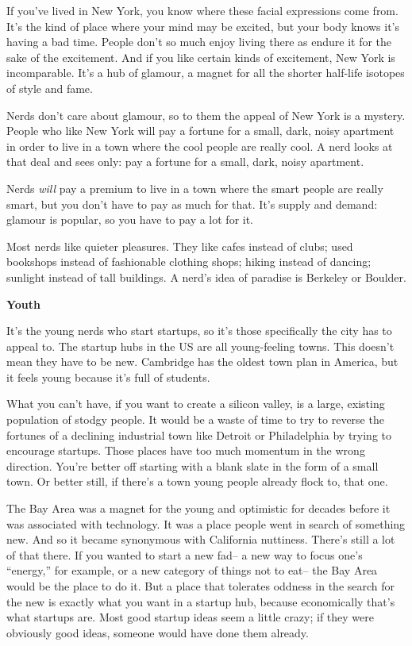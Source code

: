 \documentclass[12pt]{book}
\begin{document}
If you've lived in New York, you know where these facial expressions
come from. It's the kind of place where your mind may be excited, but
your body knows it's having a bad time. People don't so much enjoy
living there as endure it for the sake of the excitement. And if you
like certain kinds of excitement, New York is incomparable. It's a hub
of glamour, a magnet for all the shorter half-life isotopes of style and
fame.

Nerds don't care about glamour, so to them the appeal of New York is a
mystery. People who like New York will pay a fortune for a small, dark,
noisy apartment in order to live in a town where the cool people are
really cool. A nerd looks at that deal and sees only: pay a fortune for
a small, dark, noisy apartment.

Nerds \emph{will} pay a premium to live in a town where the smart people
are really smart, but you don't have to pay as much for that. It's
supply and demand: glamour is popular, so you have to pay a lot for it.

Most nerds like quieter pleasures. They like cafes instead of clubs;
used bookshops instead of fashionable clothing shops; hiking instead of
dancing; sunlight instead of tall buildings. A nerd's idea of paradise
is Berkeley or Boulder.

\textbf{Youth}

It's the young nerds who start startups, so it's those specifically the
city has to appeal to. The startup hubs in the US are all young-feeling
towns. This doesn't mean they have to be new. Cambridge has the oldest
town plan in America, but it feels young because it's full of students.

What you can't have, if you want to create a silicon valley, is a large,
existing population of stodgy people. It would be a waste of time to try
to reverse the fortunes of a declining industrial town like Detroit or
Philadelphia by trying to encourage startups. Those places have too much
momentum in the wrong direction. You're better off starting with a blank
slate in the form of a small town. Or better still, if there's a town
young people already flock to, that one.

The Bay Area was a magnet for the young and optimistic for decades
before it was associated with technology. It was a place people went in
search of something new. And so it became synonymous with California
nuttiness. There's still a lot of that there. If you wanted to start a
new fad-- a new way to focus one's ``energy,'' for example, or a new
category of things not to eat-- the Bay Area would be the place to do
it. But a place that tolerates oddness in the search for the new is
exactly what you want in a startup hub, because economically that's what
startups are. Most good startup ideas seem a little crazy; if they were
obviously good ideas, someone would have done them already.
\end{document}
